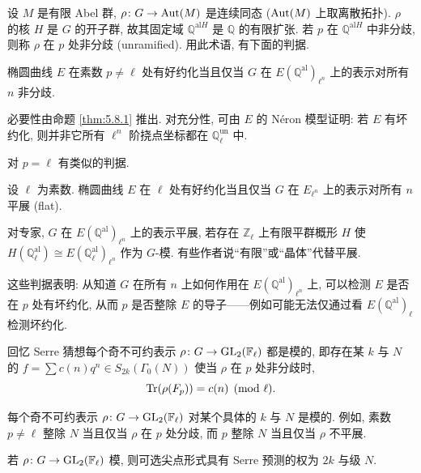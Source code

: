 设 $M$ 是有限 Abel 群, $\rho\colon G\to\operatorname{Aut}(M)$ 是连续同态 ($\operatorname{Aut}(M)$ 上取离散拓扑). $\rho$ 的核 $H$ 是 $G$ 的开子群, 故其固定域 $\mathbb{Q}^{\mathrm{al}H}$ 是 $\mathbb{Q}$ 的有限扩张. 若 $p$ 在 $\mathbb{Q}^{\mathrm{al}H}$ 中非分歧, 则称 $\rho$ 在 $p$ 处非分歧 (unramified). 用此术语, 有下面的判据.

\begin{theorem} \label{thm:5.9.1} 
椭圆曲线 $E$ 在素数 $p\neq\ell$ 处有好约化当且仅当 $G$ 在 $E(\mathbb{Q}^{\mathrm{al}})_{\ell^n}$ 上的表示对所有 $n$ 非分歧.
\end{theorem}

必要性由命题 \ref{thm:5.8.1} 推出. 对充分性, 可由 $E$ 的 N\'eron 模型证明: 若 $E$ 有坏约化, 则并非它所有 $\ell^n$ 阶挠点坐标都在 $\mathbb{Q}_\ell^{\mathrm{un}}$ 中.

对 $p = \ell$ 有类似的判据.

\begin{theorem} \label{thm:5.9.2} 
设 $\ell$ 为素数. 椭圆曲线 $E$ 在 $\ell$ 处有好约化当且仅当 $G$ 在 $E_{\ell^n}$ 上的表示对所有 $n$ 平展 (flat).
\end{theorem}

对专家, $G$ 在 $E(\mathbb{Q}^{\mathrm{al}})_{\ell^n}$ 上的表示平展, 若存在 $\mathbb{Z}_\ell$ 上有限平群概形 $H$ 使 $H(\mathbb{Q}_\ell^{\mathrm{al}})\cong E(\mathbb{Q}_\ell^{\mathrm{al}})_{\ell^n}$ 作为 $G$-模. 有些作者说``有限''或``晶体''代替平展.

这些判据表明: 从知道 $G$ 在所有 $n$ 上如何作用在 $E(\mathbb{Q}^{\mathrm{al}})_{\ell^n}$ 上, 可以检测 $E$ 是否在 $p$ 处有坏约化, 从而 $p$ 是否整除 $E$ 的导子——例如可能无法仅通过看 $E(\mathbb{Q}^{\mathrm{al}})_{\ell}$ 检测坏约化.

回忆 Serre 猜想每个奇不可约表示 $\rho\colon G\to\operatorname{GL}_2(\mathbb{F}_\ell)$ 都是模的, 即存在某 $k$ 与 $N$ 的 $f = \sum c(n)q^n\in S_{2k}(\Gamma_0(N))$ 使当 $\rho$ 在 $p$ 处非分歧时,
\[
\operatorname{Tr}(\rho(F_p)) = c(n) \pmod{\ell}.
\]

\begin{conjecture}[精细 Serre] \label{thm:5.9.3} 
每个奇不可约表示 $\rho\colon G\to\operatorname{GL}_2(\mathbb{F}_\ell)$ 对某个具体的 $k$ 与 $N$ 是模的. 例如, 素数 $p\neq\ell$ 整除 $N$ 当且仅当 $\rho$ 在 $p$ 处分歧, 而 $p$ 整除 $N$ 当且仅当 $\rho$ 不平展.
\end{conjecture}

\begin{theorem}[Ribet 等人] \label{thm:5.9.4} 
若 $\rho\colon G\to\operatorname{GL}_2(\mathbb{F}_\ell)$ 模, 则可选尖点形式具有 Serre 预测的权为 $2k$ 与级 $N$.
\end{theorem}

